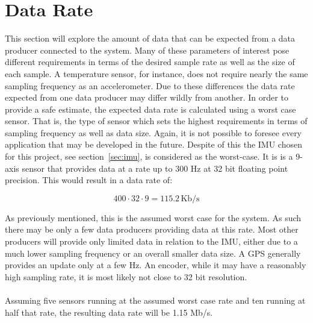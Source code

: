 
\section{Data Rate}\label{sec:data_rate}
This section will explore the amount of data that can be expected from a data producer connected to the system.
Many of these parameters of interest pose different requirements in terms of the desired sample rate as well as the size of each sample.
A temperature sensor, for instance, does not require nearly the same sampling frequency as an accelerometer.
Due to these differences the data rate expected from one data producer may differ wildly from another.
In order to provide a safe estimate, the expected data rate is calculated using a worst case sensor.
That is, the type of sensor which sets the highest requirements in terms of sampling frequency as well as data size.
Again, it is not possible to foresee every application that may be developed in the future.
Despite of this the IMU chosen for this project, see section~\ref{sec:imu}, is considered as the worst-case.
It is is a 9-axis sensor that provides data at a rate up to 300 Hz at 32 bit floating point precision.
This would result in a data rate of:

$$400\cdot32\cdot9=115.2\,\text{Kb/s}$$

As previously mentioned, this is the assumed worst case for the system.
As such there may be only a few data producers providing data at this rate.
Most other producers will provide only limited data in relation to the IMU, either due to a much lower sampling frequency or an overall smaller data size.
A GPS generally provides an update only at a few \si{\hertz}. 
An encoder, while it may have a reasonably high sampling rate, it is most likely not close to 32 bit resolution.
\\~\\
Assuming five sensors running at the assumed worst case rate and ten running at half that rate, the resulting data rate will be 1.15 Mb/s.


